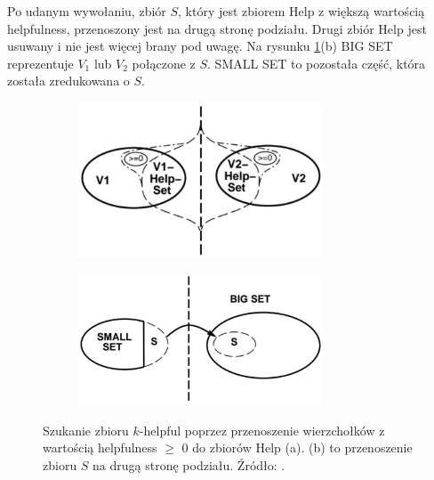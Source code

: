 Po udanym wywołaniu, zbiór $S$, który jest zbiorem Help z większą wartością helpfulness, przenoszony jest
na drugą stronę podziału.
Drugi zbiór Help jest usuwany i nie jest więcej brany pod uwagę.
Na rysunku \ref{im:building-helpfulsets}(b) BIG SET reprezentuje $V_1$ lub $V_2$ połączone z $S$.
SMALL SET to pozostała część, która została zredukowana o $S$.
\begin{figure}[h]
\begin{subfigure}{.5\textwidth}
    \centering
    \includegraphics[width=0.8\textwidth]{images/building-helpfulsets/1}
    \caption[short]{}
\end{subfigure}
\begin{subfigure}{.5\textwidth}
    \centering
    \includegraphics[width=0.8\textwidth]{images/building-helpfulsets/2}
    \caption[short]{}
\end{subfigure}%
\caption{Szukanie zbioru $k$-helpful poprzez przenoszenie wierzchołków z wartością helpfulness $\geq$ $0$
do zbiorów Help (a). (b) to przenoszenie zbioru $S$ na drugą stronę podziału.
Źródło: \cite{article}.}
\label{im:building-helpfulsets}
\end{figure}